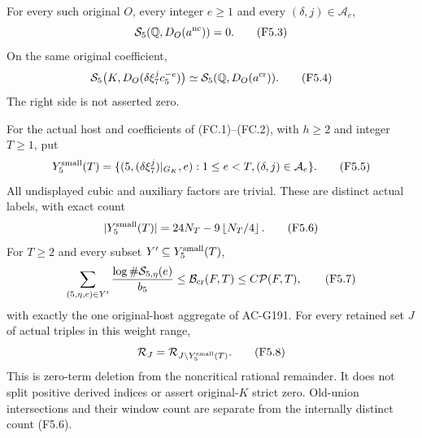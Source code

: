 \begin{theorem}
\label{AC-G199}
For every such original $O$, every integer $e\geq1$ and every
$(\delta,j)\in\mathcal A_e$,
\[
                  \mathcal S_5(\mathbb Q,D_O(a^{\rm nc}))=0.
 \tag{F5.3}
\]
On the same original coefficient,
\[
 \mathcal S_5\bigl(K,D_O(\delta\xi_7^j c_5^{-e})\bigr)
                \simeq\mathcal S_5(\mathbb Q,D_O(a^{\rm cr})).
 \tag{F5.4}
\]
The right side is not asserted zero.

For the actual host and coefficients of (FC.1)--(FC.2), with
$h\geq2$ and integer $T\geq1$, put
\[
 Y^{\rm small}_5(T)=
 \{(5,(\delta\xi_7^j)|_{G_K},e):1\leq e<T,
                                      (\delta,j)\in\mathcal A_e\}.
 \tag{F5.5}
\]
All undisplayed cubic and auxiliary factors are trivial.
These are distinct actual labels, with exact count
\[
          |Y^{\rm small}_5(T)|=24N_T-9\left\lfloor N_T/4\right\rfloor.
 \tag{F5.6}
\]
For $T\geq2$ and every subset $Y'\subseteq Y^{\rm small}_5(T)$,
\[
 \sum_{(5,\eta,e)\in Y'}
             \frac{\log\#\mathcal S_{5,\eta}(e)}{b_5}
       \leq\mathcal B_{\rm cr}(F,T)\leq C\mathcal P(F,T),
 \tag{F5.7}
\]
with exactly the one original-host aggregate of AC-G191.
For every retained set $J$ of actual triples in this weight range,
\[
                \mathcal R_J=
                      \mathcal R_{J\setminus Y^{\rm small}_5(T)}.
 \tag{F5.8}
\]
This is zero-term deletion from the noncritical rational remainder.
It does not split positive derived indices or assert original-$K$
strict zero. Old-union intersections and their window count are
separate from the internally distinct count (F5.6).
\end{theorem}

